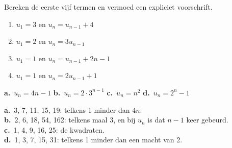 \begin{oefeningen}
\begin{oefening}[2]\label{oef:h1-recexpl}
Bereken de eerste vijf termen en vermoed een expliciet voorschrift.
\begin{enumerate}
  \item $u_1 = 3$ en $u_n = u_{n-1} + 4$
  \item $u_1 = 2$ en $u_n = 3u_{n-1}$
  \item $u_1 = 1$ en $u_n = u_{n-1} + 2n - 1$
  \item $u_1 = 1$ en $u_n = 2u_{n-1} + 1$
\end{enumerate}
\begin{solution}
\textbf{a.}~$u_n=4n-1$ \quad \textbf{b.}~$u_n=2\cdot 3^{n-1}$ \quad \textbf{c.}~$u_n=n^2$ \quad \textbf{d.}~$u_n=2^n-1$
\end{solution}
\begin{fullsolution}
\textbf{a.}~3, 7, 11, 15, 19: telkens 1 minder dan $4n$.\\
\textbf{b.}~2, 6, 18, 54, 162: telkens maal 3, en bij $u_n$ is dat $n-1$ keer gebeurd.\\
\textbf{c.}~1, 4, 9, 16, 25: de kwadraten.\\
\textbf{d.}~1, 3, 7, 15, 31: telkens 1 minder dan een macht van 2.
\end{fullsolution}
\end{oefening}


\end{oefeningen}
